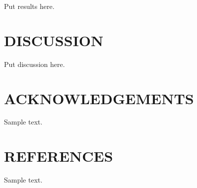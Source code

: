 \documentclass[twocolumn,10pt]{asme2e}
\begin{document}
Put results here.

\section*{DISCUSSION}

Put discussion here.

\section*{ACKNOWLEDGEMENTS}

Sample text.

\section*{REFERENCES}

Sample text.
\end{document}
